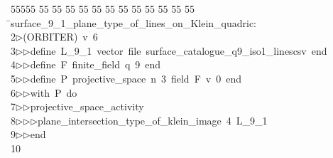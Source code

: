 %
%
\begin{tabbing}
55555 \= 55 \= 55 \= 55 \= 55 \= 55 \= 55 \= 55 \= 55 \= 55 \= 55 \= 55 \= 55 \= \>surface\_9\_1\_plane\_type\_of\_lines\_on\_Klein\_quadric:\\[0pt]
2\>$\triangleright$\>(ORBITER)\ v\ 6\ \\[0pt]
3\>$\triangleright$\>$\triangleright$\>define\ L\_9\_1\ vector\ file\ surface\_catalogue\_q9\_iso1\_linescsv\ end\ \\[0pt]
4\>$\triangleright$\>$\triangleright$\>define\ F\ finite\_field\ q\ 9\ end\ \\[0pt]
5\>$\triangleright$\>$\triangleright$\>define\ P\ projective\_space\ n\ 3\ field\ F\ v\ 0\ end\ \\[0pt]
6\>$\triangleright$\>$\triangleright$\>with\ P\ do\ \\[0pt]
7\>$\triangleright$\>$\triangleright$\>projective\_space\_activity\ \\[0pt]
8\>$\triangleright$\>$\triangleright$\>$\triangleright$\>plane\_intersection\_type\_of\_klein\_image\ 4\ L\_9\_1\ \\[0pt]
9\>$\triangleright$\>$\triangleright$\>end\ \\[0pt]
10\>\end{tabbing}
